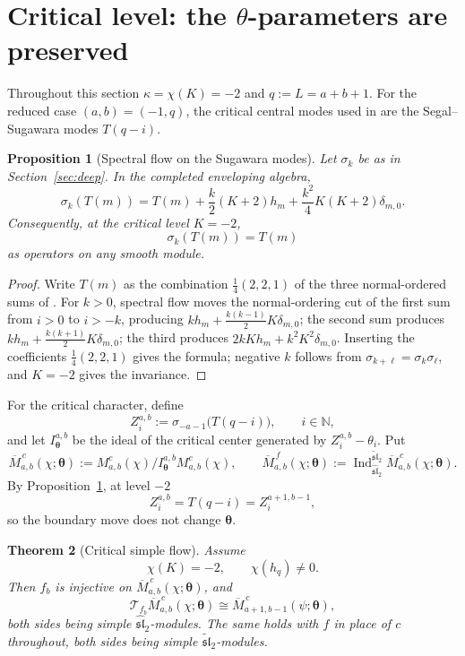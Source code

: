 \documentclass[11pt,a4paper]{article}
\newcommand{\N}{\mathbb N}
\newcommand{\slh}{\widehat{\mathfrak{sl}}_2}
\newcommand{\slt}{\widetilde{\mathfrak{sl}}_2}
\newcommand{\Ind}{\operatorname{Ind}}
\newcommand{\T}{\mathcal T}
\theoremstyle{plainupright}
\newtheorem{proposition}{Proposition}[section]
\newtheorem{theorem}[proposition]{Theorem}
\begin{document}
\section{Critical level: the \(\theta\)-parameters are preserved}\label{sec:critical}

Throughout this section \(\kappa=\chi(K)=-2\) and
\(q:=L=a+b+1\). For the reduced case \((a,b)=(-1,q)\), the critical central
modes used in \cite{FGXZ} are the Segal--Sugawara modes \(T(q-i)\).

\begin{proposition}[Spectral flow on the Sugawara modes]\label{prop:spectral}
Let \(\sigma_k\) be as in Section~\ref{sec:deep}. In the completed enveloping
algebra,
\[
\boxed{\ \sigma_k(T(m))
=T(m)+\frac{k}{2}(K+2)h_m+\frac{k^2}{4}K(K+2)\delta_{m,0}.\ }
\]
Consequently, at the critical level \(K=-2\),
\[
\boxed{\ \sigma_k(T(m))=T(m)\ }
\]
as operators on any smooth module.
\end{proposition}

\begin{proof}
Write \(T(m)\) as the combination \(\tfrac14(2,2,1)\) of the three
normal-ordered sums of \cite[formula (2.3)]{FGXZ}. For \(k>0\), spectral flow
moves the normal-ordering cut of the first sum from \(i>0\) to \(i>-k\),
producing \(kh_m+\tfrac{k(k-1)}{2}K\delta_{m,0}\); the second sum produces
\(kh_m+\tfrac{k(k+1)}{2}K\delta_{m,0}\); the third produces
\(2kKh_m+k^2K^2\delta_{m,0}\). Inserting the coefficients \(\tfrac14(2,2,1)\)
gives the formula; negative \(k\) follows from
\(\sigma_{k+\ell}=\sigma_k\sigma_\ell\), and \(K=-2\) gives the invariance.
\end{proof}

For the critical character, define
\[
Z_i^{a,b}:=\sigma_{-a-1}\bigl(T(q-i)\bigr),\qquad i\in\N,
\]
and let \(I^{a,b}_{\boldsymbol\theta}\) be the ideal of the critical center
generated by \(Z_i^{a,b}-\theta_i\). Put
\[
\overline M^{\,c}_{a,b}(\chi;\boldsymbol\theta)
:=M^c_{a,b}(\chi)/I^{a,b}_{\boldsymbol\theta}M^c_{a,b}(\chi),
\qquad
\overline M^{\,f}_{a,b}(\chi;\boldsymbol\theta)
:=\Ind_{\slh}^{\slt}\overline M^{\,c}_{a,b}(\chi;\boldsymbol\theta).
\]
By Proposition~\ref{prop:spectral}, at level \(-2\)
\[
Z_i^{a,b}=T(q-i)=Z_i^{a+1,b-1},
\]
so the boundary move does not change \(\boldsymbol\theta\).

\begin{theorem}[Critical simple flow]\label{thm:critical-flow}
Assume
\[
\chi(K)=-2,\qquad \chi(h_q)\ne0.
\]
Then \(f_b\) is injective on \(\overline M^{\,c}_{a,b}(\chi;\boldsymbol\theta)\), and
\[
\boxed{\ \T_{f_b}\overline M^{\,c}_{a,b}(\chi;\boldsymbol\theta)
\cong \overline M^{\,c}_{a+1,b-1}(\psi;\boldsymbol\theta),\ }
\]
both sides being simple \(\slh\)-modules. The same holds with \(f\) in place
of \(c\) throughout, both sides being simple \(\slt\)-modules.
\end{theorem}
\end{document}
